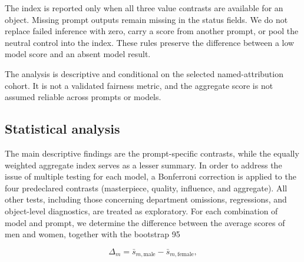 \documentclass[pdflatex,sn-basic,Numbered]{sn-jnl}
\begin{document}
The index is reported only when all three value contrasts are available for an object. Missing prompt outputs remain missing in the status fields. We do not replace failed inference with zero, carry a score from another prompt, or pool the neutral control into the index. These rules preserve the difference between a low model score and an absent model result.

The analysis is descriptive and conditional on the selected named-attribution cohort. It is not a validated fairness metric, and the aggregate score is not assumed reliable across prompts or models.

\subsection{Statistical analysis}
The main descriptive findings are the prompt-specific contrasts, while the equally weighted aggregate index serves as a lesser summary. In order to address the issue of multiple testing for each model, a Bonferroni correction is applied to the four predeclared contrasts (masterpiece, quality, influence, and aggregate). All other tests, including those concerning department omissions, regressions, and object-level diagnostics, are treated as exploratory.
For each combination of model and prompt, we determine the difference between the average scores of men and women, together with the bootstrap 95%

\[\Delta_m = \bar{s}_{m,\mathrm{male}} - \bar{s}_{m,\mathrm{female}},\]
\end{document}
